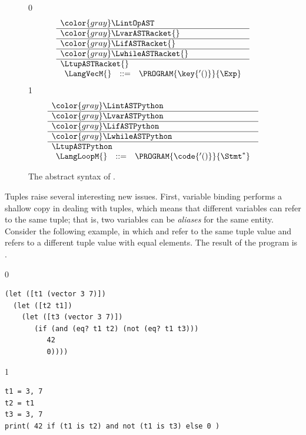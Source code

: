 \documentclass[7x10]{TimesAPriori_MIT}%
\newcommand{\gray}[1]{{\color{gray} #1}}
\def\racketEd{0}
\def\pythonEd{1}
\def\edition{0}
\numberwithin{theorem}{chapter}
\numberwithin{definition}{chapter}
\numberwithin{equation}{chapter}
\begin{document}
\begin{figure}[tp]
\centering
\begin{tcolorbox}[colback=white]
    \small
{\if\edition\racketEd    
\[
\begin{array}{l}
  \gray{\LintOpAST} \\ \hline
  \gray{\LvarASTRacket{}} \\ \hline
  \gray{\LifASTRacket{}} \\ \hline
  \gray{\LwhileASTRacket{}} \\ \hline
  \LtupASTRacket{} \\
\begin{array}{lcl}
  \LangVecM{} &::=& \PROGRAM{\key{'()}}{\Exp}
\end{array}
\end{array}
\]
\fi}
{\if\edition\pythonEd
\[
\begin{array}{l}
  \gray{\LintASTPython} \\ \hline
  \gray{\LvarASTPython} \\ \hline
  \gray{\LifASTPython} \\ \hline
  \gray{\LwhileASTPython} \\ \hline
  \LtupASTPython \\
  \begin{array}{lcl}
    \LangLoopM{} &::=& \PROGRAM{\code{'()}}{\Stmt^{*}}
  \end{array}
\end{array}
\]
\fi}
\end{tcolorbox}

\caption{The abstract syntax of \LangVec{}.}
\label{fig:Lvec-syntax}
\end{figure}

Tuples raise several interesting new issues.  First, variable binding
performs a shallow copy in dealing with tuples, which means that
different variables can refer to the same tuple; that is, two
variables can be \emph{aliases} for the same
entity. Consider the following example, in which  and
 refer to the same tuple value and  refers to a
different tuple value with equal elements. The result of the
program is .


\begin{center}
\begin{minipage}{0.96\textwidth}
{\if\edition\racketEd        
\begin{lstlisting}
(let ([t1 (vector 3 7)])
  (let ([t2 t1])
    (let ([t3 (vector 3 7)])
       (if (and (eq? t1 t2) (not (eq? t1 t3)))
          42
          0))))
\end{lstlisting}
\fi}
{\if\edition\pythonEd
\begin{lstlisting}
t1 = 3, 7
t2 = t1
t3 = 3, 7
print( 42 if (t1 is t2) and not (t1 is t3) else 0 )
\end{lstlisting}
\fi}
\end{minipage}
\end{center}
\end{document}
